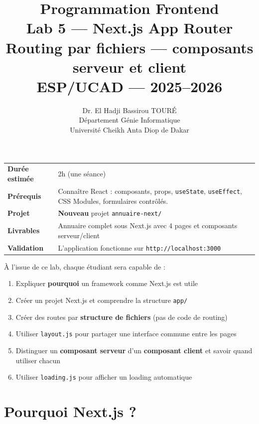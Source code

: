 \documentclass[11pt,a4paper]{article}
\title{\vspace{-1cm}\textbf{\LARGE Programmation Frontend}\\[0.8cm]\textbf{\huge Lab 5 --- Next.js App Router}\\[0.3cm]\textbf{\Large Routing par fichiers --- composants serveur et client}\\[0.5cm]\large ESP/UCAD --- 2025--2026}
\author{Dr. El Hadji Bassirou TOURÉ\\Département Génie Informatique\\Université Cheikh Anta Diop de Dakar}
\date{}
\begin{document}
\maketitle
\thispagestyle{empty}
\vspace{0.5cm}

\begin{prereqbox}
\begin{center}
\begin{tabular}{lp{10cm}}
\toprule
\textbf{Durée estimée} & 2h (une séance) \\
\textbf{Prérequis} & Connaître React : composants, props, \texttt{useState}, \texttt{useEffect}, CSS Modules, formulaires contrôlés. \\
\textbf{Projet} & \textbf{Nouveau} projet \texttt{annuaire-next/} \\
\textbf{Livrables} & Annuaire complet sous Next.js avec 4 pages et composants serveur/client \\
\textbf{Validation} & L'application fonctionne sur \texttt{http://localhost:3000} \\
\bottomrule
\end{tabular}
\end{center}
\end{prereqbox}

\begin{objectifbox}
À l'issue de ce lab, chaque étudiant sera capable de :
\begin{enumerate}[nosep]
\item Expliquer \textbf{pourquoi} un framework comme Next.js est utile
\item Créer un projet Next.js et comprendre la structure \texttt{app/}
\item Créer des routes par \textbf{structure de fichiers} (pas de code de routing)
\item Utiliser \texttt{layout.js} pour partager une interface commune entre les pages
\item Distinguer un \textbf{composant serveur} d'un \textbf{composant client} et savoir quand utiliser chacun
\item Utiliser \texttt{loading.js} pour afficher un loading automatique
\end{enumerate}
\end{objectifbox}

\tableofcontents
\newpage

\section{Pourquoi Next.js ?}
\end{document}
